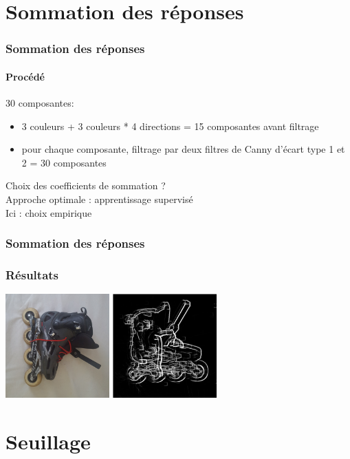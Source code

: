 \documentclass[french]{beamer}
\begin{document}
\section{Sommation des réponses}

\begin{frame}
	\frametitle{Sommation des réponses}
	\framesubtitle{Procédé}
	30 composantes:
	\begin{itemize}
		\item 3 couleurs + 3 couleurs * 4 directions = 15 composantes avant filtrage
		\item pour chaque composante, filtrage par deux filtres de Canny d'écart type 1 et 2 = 30 composantes
	\end{itemize}
	Choix des coefficients de sommation ?\\
	Approche optimale : apprentissage supervisé\\
	Ici : choix empirique
\end{frame}

\begin{frame}
	\frametitle{Sommation des réponses}
	\frametitle{Résultats}
	\includegraphics[width=4cm]{images/roller.png} \; \includegraphics[width = 4cm]{images/roller_res.jpg}
\end{frame}

\section{Seuillage}
\end{document}
